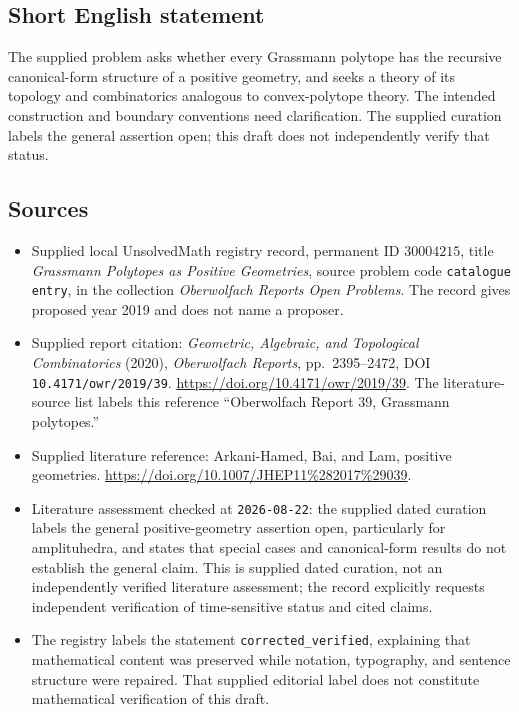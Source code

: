\documentclass[11pt]{article}
\begin{document}
\subsection{Short English statement}
The supplied problem asks whether every Grassmann polytope has the recursive canonical-form structure of a positive geometry, and seeks a theory of its topology and combinatorics analogous to convex-polytope theory. The intended construction and boundary conventions need clarification. The supplied curation labels the general assertion open; this draft does not independently verify that status.
\subsection{Sources}
\begin{itemize}
\item Supplied local UnsolvedMath registry record, permanent ID \(30004215\), title \emph{Grassmann Polytopes as Positive Geometries}, source problem code \texttt{catalogue entry}, in the collection \emph{Oberwolfach Reports Open Problems}. The record gives proposed year 2019 and does not name a proposer.
\item Supplied report citation: \emph{Geometric, Algebraic, and Topological Combinatorics} (2020), \emph{Oberwolfach Reports}, pp.\ 2395--2472, DOI \texttt{10.4171/owr/2019/39}. \url{https://doi.org/10.4171/owr/2019/39}. The literature-source list labels this reference ``Oberwolfach Report 39, Grassmann polytopes.''
\item Supplied literature reference: Arkani-Hamed, Bai, and Lam, positive geometries. \url{https://doi.org/10.1007/JHEP11%282017%29039}.
\item Literature assessment checked at \texttt{2026-08-22}: the supplied dated curation labels the general positive-geometry assertion open, particularly for amplituhedra, and states that special cases and canonical-form results do not establish the general claim. This is supplied dated curation, not an independently verified literature assessment; the record explicitly requests independent verification of time-sensitive status and cited claims.
\item The registry labels the statement \texttt{corrected\_verified}, explaining that mathematical content was preserved while notation, typography, and sentence structure were repaired. That supplied editorial label does not constitute mathematical verification of this draft.
\end{itemize}
\end{document}
